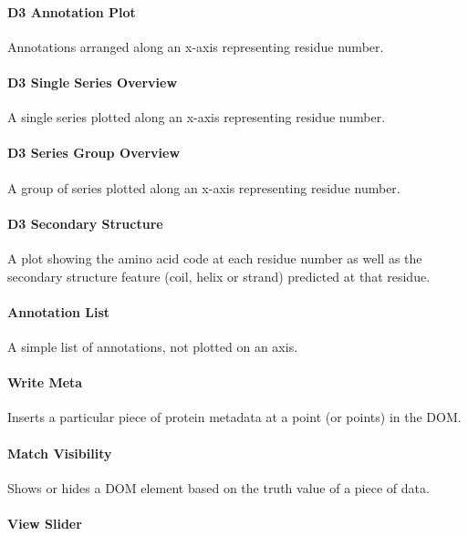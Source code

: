 \documentclass[fleqn,10pt]{article} %
\begin{document}
\paragraph{D3 Annotation Plot}

Annotations arranged along an x-axis representing residue number.

\paragraph{D3 Single Series Overview}

A single series plotted along an x-axis representing residue number.

\paragraph{D3 Series Group Overview}

A group of series plotted along an x-axis representing residue number.

\paragraph{D3 Secondary Structure}

A plot showing the amino acid code at each residue number as well as the secondary structure feature (coil, helix or strand) predicted at that residue.

\paragraph{Annotation List}

A simple list of annotations, not plotted on an axis.

\paragraph{Write Meta}

Inserts a particular piece of protein metadata at a point (or points) in the DOM.

\paragraph{Match Visibility}

Shows or hides a DOM element based on the truth value of a piece of data.

\paragraph{View Slider}
\end{document}
